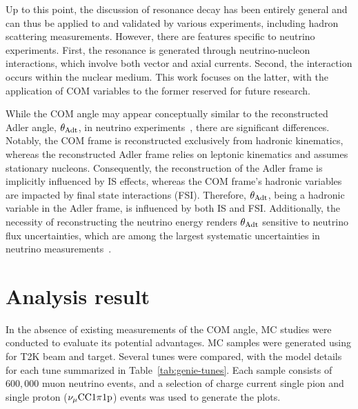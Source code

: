Up to this point, the discussion of resonance decay has been entirely general and can thus be applied to and validated by various experiments, including hadron scattering measurements. 
However, there are features specific to neutrino experiments. 
First, the resonance is generated through neutrino-nucleon interactions, which involve both vector and axial currents. 
Second, the interaction occurs within the nuclear medium. 
This work focuses on the latter, with the application of COM variables to the former reserved for future research.

While the COM angle may appear conceptually similar to the reconstructed Adler angle, $\theta_{\textrm{Adt}}$, in neutrino experiments~\cite{Sanchez:2015yvw}, there are significant differences. 
Notably, the COM frame is reconstructed exclusively from hadronic kinematics, whereas the reconstructed Adler frame relies on leptonic kinematics and assumes stationary nucleons. 
Consequently, the reconstruction of the Adler frame is implicitly influenced by IS effects, whereas the COM frame's hadronic variables are impacted by final state interactions (FSI). 
Therefore, $\theta_{\textrm{Adt}}$, being a hadronic variable in the Adler frame, is influenced by both IS and FSI. 
Additionally, the necessity of reconstructing the neutrino energy renders $\theta_{\textrm{Adt}}$ sensitive to neutrino flux uncertainties, which are among the largest systematic uncertainties in neutrino measurements~\cite{T2K:2019yqu,T2K:2021naz,MicroBooNECollaboration:2024gvg,NOvA:2023uxq,MINERvA:2022djk}.


\section{Analysis result}
\label{sec:ana}

In the absence of existing measurements of the COM angle, MC studies were conducted to evaluate its potential advantages.
MC samples were generated using \genie \cite{Andreopoulos:2009rq, GENIE:2021npt} for T2K beam and target. 
Several \genie tunes were compared, with the model details for each tune summarized in Table~\ref{tab:genie-tunes}. 
Each sample consists of $600,000$ muon neutrino events, and a selection of charge current single pion and single proton ($\nu_{\mu}\textrm{CC}1\pi1\textrm{p}$) events was used to generate the plots.

